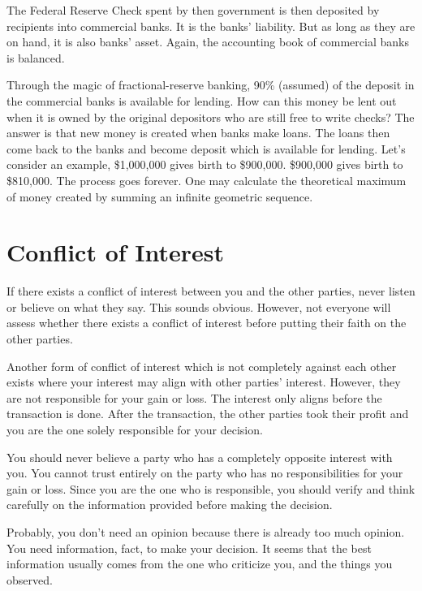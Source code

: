 \documentclass[a4paper]{report}
\begin{document}
The Federal Reserve Check spent by then government is then deposited by recipients into commercial banks. It is the banks' liability. But as long as they are on hand, it is also banks' asset. Again, the accounting book of commercial banks is balanced.

Through the magic of fractional-reserve banking, 90\% (assumed) of the deposit in the commercial banks is available for lending. How can this money be lent out when it is owned by the original depositors who are still free to write checks? The answer is that new money is created when banks make loans. The loans then come back to the banks and become deposit which is available for lending. Let's consider an example, \$1,000,000 gives birth to \$900,000. \$900,000 gives birth to \$810,000. The process goes forever. One may calculate the theoretical maximum of money created by summing an infinite geometric sequence.

\chapter{Conflict of Interest}
If there exists a conflict of interest between you and the other parties, never listen or believe on what they say. This sounds obvious. However, not everyone will assess whether there exists a conflict of interest before putting their faith on the other parties.

Another form of conflict of interest which is not completely against each other exists where your interest may align with other parties' interest. However, they are not responsible for your gain or loss. The interest only aligns before the transaction is done. After the transaction, the other parties took their profit and you are the one solely responsible for your decision.

You should never believe a party who has a completely opposite interest with you. You cannot trust entirely on the party who has no responsibilities for your gain or loss. Since you are the one who is responsible, you should verify and think carefully on the information provided before making the decision.

Probably, you don't need an opinion because there is already too much opinion. You need information, fact, to make your decision. It seems that the best information usually comes from the one who criticize you, and the things you observed.
\end{document}
